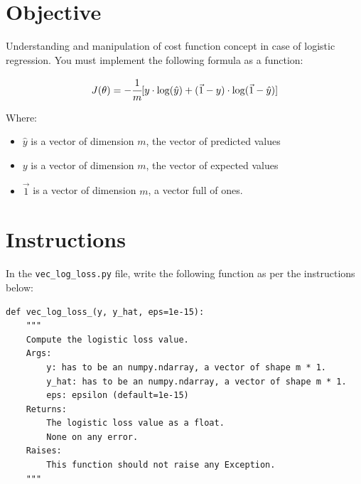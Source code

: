 \documentclass{42-en}
\begin{document}
\section*{Objective}
Understanding and manipulation of cost function concept in case of logistic regression.
You must implement the following formula as a function:  

$$
J( \theta) = -\cfrac{1} {m} \lbrack y \cdot \log(\hat{y}) + (\vec{1} - y) \cdot \log(\vec{1} - \hat{y})\rbrack
$$

Where:
\begin{itemize}
  \item $\hat{y}$ is a vector of dimension $m$, the vector of predicted values
  \item $y$ is a vector of dimension $m$, the vector of expected values
  \item $\vec{1}$ is a vector of dimension $m$, a vector full of ones.
\end{itemize}


\section*{Instructions}
In the \texttt{vec\_log\_loss.py} file, write the following function as per the instructions below:

\begin{verbatim}
def vec_log_loss_(y, y_hat, eps=1e-15):
    """
    Compute the logistic loss value.
    Args:
        y: has to be an numpy.ndarray, a vector of shape m * 1.
        y_hat: has to be an numpy.ndarray, a vector of shape m * 1.
        eps: epsilon (default=1e-15)
    Returns:
        The logistic loss value as a float.
        None on any error.
    Raises:
        This function should not raise any Exception.
    """
\end{verbatim}


\end{document}
